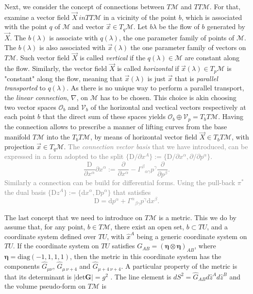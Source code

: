 \documentclass[11pt,a4paper,headinclude=true,DIV=14,BCOR=8mm,chapterprefix,listof=totoc,twoside,openright,abstracton]{scrbook}
\newcommand{\gray}[1]{\textcolor{gray}{#1}}
\begin{document}
Next, we consider the concept of connections between $T\mathcal{M}$ and $TT\mathcal{M}$. For that, examine a vector field $\vec{X} \ in TT\mathcal{M}$  in a vicinity of the point $b$, which is associated with the point $q$ of $\mathcal{M}$ and vector $\vec{x}\in T_{q}\mathcal{M}$. Let $b{\lambda}$ be the flow of $b$ generated by $\vec{X}$. The $b(\lambda)$ is associate with $q(\lambda)$, the one parameter family of points of $\mathcal{M}$. The $b(\lambda)$ is also associated with $\vec{x}(\lambda)$ the one parameter family of vectors on $T\mathcal{M}$. Such vector field $\vec{X}$ is called \textit{vertical} if the $q(\lambda)\in\mathcal{M}$ are constant along the flow. Similarly, the vector field $\vec{X}$ is called \textit{horizontal} if $\vec{x}(\lambda)\in T_p \mathcal{M}$ is "constant" along the flow, meaning that $\vec{x}(\lambda)$ is just $\vec{x}$ that is \textit{parallel transported} to $q(\lambda)$. As there is no unique way to perform a parallel transport, the \textit{linear connection}, $\nabla$, on $\mathcal{M}$ has to be chosen. This choice is akin choosing two vector spaces $\mathcal{O}_b$ and $\mathcal{V}_b$ of the horizontal and vectical vectors respectively at each point $b$ that the direct sum of these spaces yields $\mathcal{O}_b\oplus \mathcal{V}_p = T_b T\mathcal{M}$. Having the connection allows to prescribe a manner of lifting curves from the base manifold $T\mathcal{M}$ into the $T_b T\mathcal{M}$, by means of horizontal vector field $\vec{X}\in T_bT\mathcal{M}$, with projection $\vec{x}\in T_q\mathcal{M}$. 
\gray{
    The \textit{connection vector basis} that we have introduced, can be expressed in a form adopted to the split $\{\text{D}/\partial x^A \}:=\{\text{D}/\partial x^{\alpha}, \partial/\partial p^{\alpha} \}$. 
    \begin{equation}
    \frac{\text{D}}{\partial x^{\alpha}}{\partial x^{\alpha}} := \frac{\partial}{\partial x^{\alpha}} - {\Gamma^{\beta}}_{\alpha\gamma}p^{\gamma}\frac{\partial}{\partial p^{\beta}}.
    \end{equation}
    Similarly a connection can be build for differential forms. Using the pull-back $\pi^*$ the dual basis $\{ \text{D}z^{A} \}:=\{\text{d}x^{\alpha}, \text{D}p^{\alpha}\}$ that satisfies 
    \begin{equation}
    \text{D} = \text{d} p ^{\alpha} + {\Gamma^{\alpha}}_{\beta\gamma}p^{\gamma}\text{d}x^{\beta}.
    \end{equation}
}

The last concept that we need to introduce on $T\mathcal{M}$ is a metric. This we do by assume that, for any point, $b \in T\mathcal{M}$, there exist an open set, $b\subset TU$, and a coordinate system defined over $TU$, with $\hat{x}^A$ being a generic coordinate system on $TU$. If the coordinate system on $TU$ satisfies $G_{AB} = (\boldsymbol{\eta}\otimes\boldsymbol{\eta})_{AB}$, where $\boldsymbol{\eta} = \text{diag}(-1, 1, 1, 1)$, then the metric in this coordinate system has the components $\hat{G}_{\mu\nu}$, $\hat{G}_{\mu\: \nu+4}$ and $\hat{G}_{\mu+4 \: \nu+4}$. A particular property of the metric is that its determinant is $|\text{det}\boldsymbol{G}| = g^{2}$ \cite{Lindquist:1966}. The line element is $dS^2 = \hat{G}_{AB}d\hat{z}^A d\hat{z}^B$ and the volume pseudo-form on $T\mathcal{M}$ is
\end{document}
